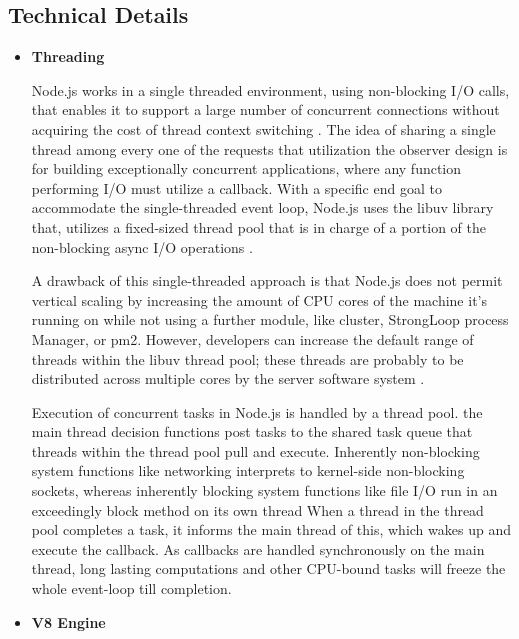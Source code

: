 \documentclass[../thesis.tex]{subfiles}
\begin{document}
\subsection*{Technical Details}
\begin{itemize}
    \item \textbf{Threading}
    \newline
    
    Node.js works in a single threaded environment, using non-blocking I/O calls, that enables it to support a large number of concurrent connections without acquiring the cost of thread context switching \cite{13}. The idea of sharing a single thread among every one of the requests that utilization the observer design is for building exceptionally concurrent applications, where any function performing I/O must utilize a callback. With a specific end goal to accommodate the single-threaded event loop, Node.js uses the libuv library that, utilizes a fixed-sized thread pool that is in charge of a portion of the non-blocking async I/O operations \cite{14}.
    \newline
    
    A drawback of this single-threaded approach is that Node.js does not permit vertical scaling by increasing the amount of CPU cores of the machine it's running on while not using a further module, like cluster, StrongLoop process Manager, or pm2. However, developers can increase the default range of threads within the libuv thread pool; these threads are probably to be distributed across multiple cores by the server software system \cite{15}.
    \newline
    
    Execution of concurrent tasks in Node.js is handled by a thread pool. the main thread decision functions post tasks to the shared task queue that threads within the thread pool pull and execute. Inherently non-blocking system functions like networking interprets to kernel-side non-blocking sockets, whereas inherently blocking system functions like file I/O run in an exceedingly block method on its own thread When a thread in the thread pool completes a task, it informs the main thread of this, which wakes up and execute the callback. As callbacks are handled synchronously on the main thread, long lasting computations and other CPU-bound tasks will freeze the whole event-loop till completion.
    \newline
    
    \item \textbf{V8 Engine}
    \newline
    

\end{itemize}
\end{document}
